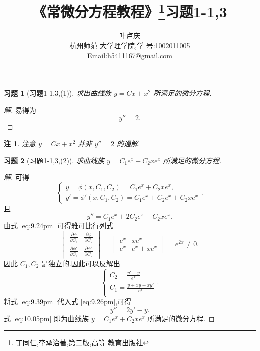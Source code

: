 \documentclass[twoside,11pt]{article}
\newtheorem*{cdtheorem}{习题}
\newenvironment{exercise}
{\begin{mdframed}[backgroundcolor=gray!40,rightline=false,leftline=false,topline=false,bottomline=false]\begin{cdtheorem}}
    {\end{cdtheorem}\end{mdframed}}
\newtheorem*{ddtheorem}{注}
\newenvironment{remark}
{\begin{mdframed}[backgroundcolor=gray!40,rightline=false,leftline=false,topline=false,bottomline=false]\begin{ddtheorem}}
    {\end{ddtheorem}\end{mdframed}}
\begin{document}
  \title{{\bf {《常微分方程教程》\footnote{丁同仁,李承治著,第二版,高等
          教育出版社}习题1-1,3}}} \author{{叶卢庆} \\{{ \small{杭州师范
          大学理学院,学
          号:1002011005}}}\\\small{Email:h5411167@gmail.com}}
  \maketitle
  \begin{exercise}[习题1-1,3,(1)]
求出曲线族 $y=Cx+x^2$ 所满足的微分方程.
  \end{exercise}
  \begin{proof}[解]
易得为
\begin{equation}
  \label{eq:8.17pm}
  y''=2.
\end{equation}
\end{proof}
\begin{remark}
  注意 $y=Cx+x^2$ 并非 $y''=2$ 的通解.
\end{remark}
\bigskip
\begin{exercise}[习题1-1,3,(2)]
求曲线族 $y=C_1e^x+C_2xe^x$ 所满足的微分方程.  
\end{exercise}
\begin{proof}[解]
  可得
  \begin{equation}
    \label{eq:9.24pm}
    \begin{cases}
      y=\phi(x,C_{1},C_{2})=C_1e^x+C_2xe^x,\\
y'=\phi'(x,C_{1},C_{2})=C_1e^x+C_2e^x+C_2xe^x
    \end{cases}.
  \end{equation}
且
\begin{equation}
  \label{eq:9.26pm}
  y''=C_1e^x+2C_2e^x+C_2xe^x.
\end{equation}
由式 \eqref{eq:9.24pm} 可得雅可比行列式
\begin{equation}
  \label{eq:9.28pm}
  \begin{vmatrix}
    \frac{\partial \phi}{\partial C_1}&\frac{\partial \phi}{\partial
      C_2}\\
\frac{\partial \phi'}{\partial C_{1}}&\frac{\partial \phi'}{\partial C_2}
  \end{vmatrix}=\begin{vmatrix}
    e^x&xe^x\\
e^x&e^x+xe^x
  \end{vmatrix}=e^{2x}\neq 0.
\end{equation}
因此 $C_1,C_2$ 是独立的.因此可以反解出
\begin{equation}
  \label{eq:9.39pm}
  \begin{cases}
    C_2=\frac{y'-y}{e^x}\\
C_1=\frac{y+xy-xy'}{e^x}\\
  \end{cases}.
\end{equation}
将式 \eqref{eq:9.39pm} 代入式 \eqref{eq:9.26pm},可得
\begin{equation}
  \label{eq:10.05pm}
  y''=2y'-y.
\end{equation}
式 \eqref{eq:10.05pm} 即为曲线族 $y=C_1e^x+C_2xe^x$ 所满足的微分方程.
\end{proof}
\end{document}
